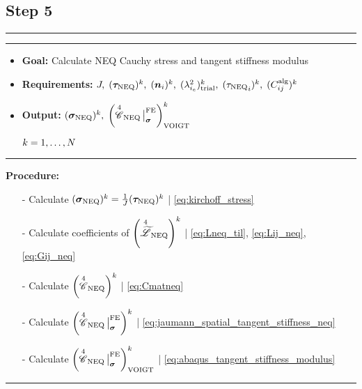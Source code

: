 \subsection*{Step 5}
\vspace{0.1cm}
\hrule
\vspace{0.1cm}
\hrule
\begin{itemize}
    \item \textbf{Goal:} Calculate NEQ Cauchy stress and tangent stiffness modulus
    \item \textbf{Requirements:} \(J,\;({\bm{\tau}_{\text{NEQ}}})^{k},\;({\bm{n}_{i}})^{k},\;({\lambda^{2}_{{i}_e}})_\text{trial}^{k},\; ({{{\tau}_{\text{NEQ}}}_{i}})^{k},\;(C^{\text{alg}}_{ij})^{k}\)
    \item \textbf{Output:} \(({\bm{\sigma}_{\text{NEQ}}})^{k},\; \left({{\overset{4}{\mathscr{C}}}_{\text{NEQ}}}{\,\big|}^{\text{FE}}_{\bm{\sigma}}\right)_{\text{VOIGT}}^{k}\)
    \item[] \(\hfill k=1,\ldots,N \)
\end{itemize}
\vspace{0.1cm}
\hrule
\textbf{Procedure:}
\begin{itemize}
    \item[-] Calculate \((\bm{\sigma}_{\text{NEQ}})^{k}= \frac{1}{J}(\bm{\tau}_{\text{NEQ}})^{k}\) \hfill | \cref{eq:kirchoff_stress}
    \item[-] Calculate coefficients of \(\left({\overset{4}{\widetilde{\mathscr{L}}}}_{\text{NEQ}}\right)^{k}\) | \cref{eq:Lneq_til}, \cref{eq:Lij_neq}, \cref{eq:Gij_neq}
    \item[-] Calculate \(\left({\overset{4}{\mathscr{C}}}_{\text{NEQ}}\right)^{k}\) \hfill | \cref{eq:Cmatneq}
    \item[-] Calculate \(\left({{\overset{4}{\mathscr{C}}}_{\text{NEQ}}}{\,\big|}^{\text{FE}}_{\bm{\sigma}}\right)^{k}\) \hfill | \cref{eq:jaumann_spatial_tangent_stiffness_neq}
    \item[-] Calculate \(\left({{\overset{4}{\mathscr{C}}}_{\text{NEQ}}}{\,\big|}^{\text{FE}}_{\bm{\sigma}}\right)^{k}_{\text{VOIGT}}\) \hfill | \cref{eq:abaqus_tangent_stiffness_modulus}

\end{itemize}
\vspace{0.1cm}
\hrule
\vspace{0.8cm}

